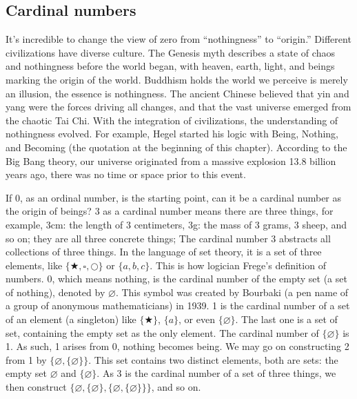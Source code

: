 \documentclass[b5paper]{article}
\begin{document}
\subsection{Cardinal numbers}

It's incredible to change the view of zero from \enquote{nothingness} to \enquote{origin.} Different civilizations have diverse culture. The Genesis myth describes a state of chaos and nothingness before the world began, with heaven, earth, light, and beings marking the origin of the world. Buddhism holds the world we perceive is merely an illusion, the essence is nothingness. The ancient Chinese believed that yin and yang were the forces driving all changes, and that the vast universe emerged from the chaotic Tai Chi. With the integration of civilizations, the understanding of nothingness evolved. For example, Hegel started his logic with Being, Nothing, and Becoming (the quotation at the beginning of this chapter). According to the Big Bang theory, our universe originated from a massive explosion 13.8 billion years ago, there was no time or space prior to this event.

 

If 0, as an ordinal number, is the starting point, can it be a cardinal number as the origin of beings? 3 as a cardinal number means there are three things, for example, 3cm: the length of 3 centimeters, 3g: the mass of 3 grams, 3 sheep, and so on; they are all three concrete things; The cardinal number 3 abstracts all collections of three things. In the language of set theory, it is a set of three elements, like $\{\bigstar, \square, \bigcirc \}$ or $\{a, b, c\}$. This is how logician Frege's definition of numbers. 0, which means nothing, is the cardinal number of the empty set (a set of nothing), denoted by $\varnothing$. This symbol was created by Bourbaki (a pen name of a group of anonymous mathematicians) in 1939. 1 is the cardinal number of a set of an element (a singleton) like $\{ \bigstar \}$, $\{ a \}$, or even $\{ \varnothing \}$. The last one is a set of set, containing the empty set as the only element. The cardinal number of $\{ \varnothing \}$ is 1. As such, 1 arises from 0, nothing becomes being. We may go on constructing 2 from 1 by $\{ \varnothing, \{ \varnothing \} \}$. This set contains two distinct elements, both are sets: the empty set $\varnothing$ and $\{ \varnothing \}$. As 3 is the cardinal number of a set of three things, we then construct $\{ \varnothing, \{ \varnothing \}, \{ \varnothing, \{ \varnothing \} \}\}$, and so on.
\end{document}
